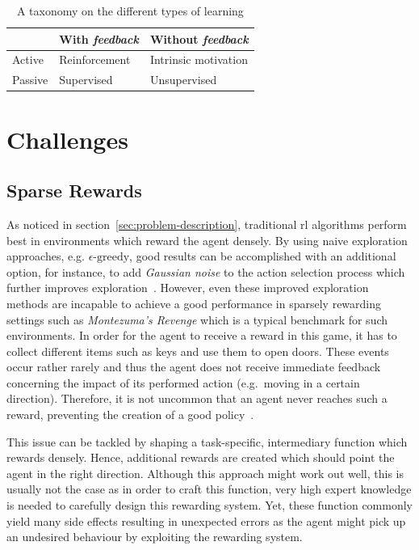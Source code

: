 \documentclass[draft,final]{vutinfth} %
\newcommand{\p}[1]{see p. #1}
\begin{document}
    \begin{table}
        \centering
        \begin{tabular}{|l|l|l|}
            \hline
            & With \textit{feedback} & Without \textit{feedback} \\
            \hline
            Active  & Reinforcement          & Intrinsic motivation      \\
            Passive & Supervised             & Unsupervised              \\
            \hline
        \end{tabular}
        \caption[A taxonomy on the different types of learning]{A taxonomy on the different types of learning\protect\footnotemark}
        \label{tab:type_learning}
    \end{table}

    \footnotetext{\citep[\p{4}]{aubret_survey_2019}}


    \section{Challenges}

    \subsection{Sparse Rewards}

    As noticed in section~\ref{sec:problem-description}, traditional \gls{rl} algorithms perform best in environments which reward the agent densely.
    By using naive exploration approaches, e.g. $\epsilon\text{-greedy}$, good results can be accomplished with an additional option, for instance, to add \textit{Gaussian noise} to the action selection process which further improves exploration~\citep{lillicrap_continuous_2019}.
    However, even these improved exploration methods are incapable to achieve a good performance in sparsely rewarding settings such as \textit{Montezuma's Revenge} which is a typical benchmark for such environments.
    In order for the agent to receive a reward in this game, it has to collect different items such as keys and use them to open doors.
    These events occur rather rarely and thus the agent does not receive immediate feedback concerning the impact of its performed action (e.g.\ moving in a certain direction).
    Therefore, it is not uncommon that an agent never reaches such a reward, preventing the creation of a good policy~\citep{aubret_survey_2019}.

    This issue can be tackled by shaping a task-specific, intermediary function which rewards densely.
    Hence, additional rewards are created which should point the agent in the right direction.
    Although this approach might work out well, this is usually not the case as in order to craft this function, very high expert knowledge is needed to carefully design this rewarding system.
    Yet, these function commonly yield many side effects resulting in unexpected errors as the agent might pick up an undesired behaviour by exploiting the rewarding system.
\end{document}
